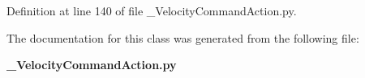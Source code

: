 \subsubsection[{action\-\_\-result}]{}\label{classoryx__drive__controller_1_1msg_1_1__VelocityCommandAction_1_1VelocityCommandAction_a2a6e56a6e4633f29de56cc9000d5aa35}


\-Definition at line 140 of file \-\_\-\-Velocity\-Command\-Action.\-py.



\-The documentation for this class was generated from the following file\-:\begin{DoxyCompactItemize}
\item 
{\bf \-\_\-\-Velocity\-Command\-Action.\-py}\end{DoxyCompactItemize}
